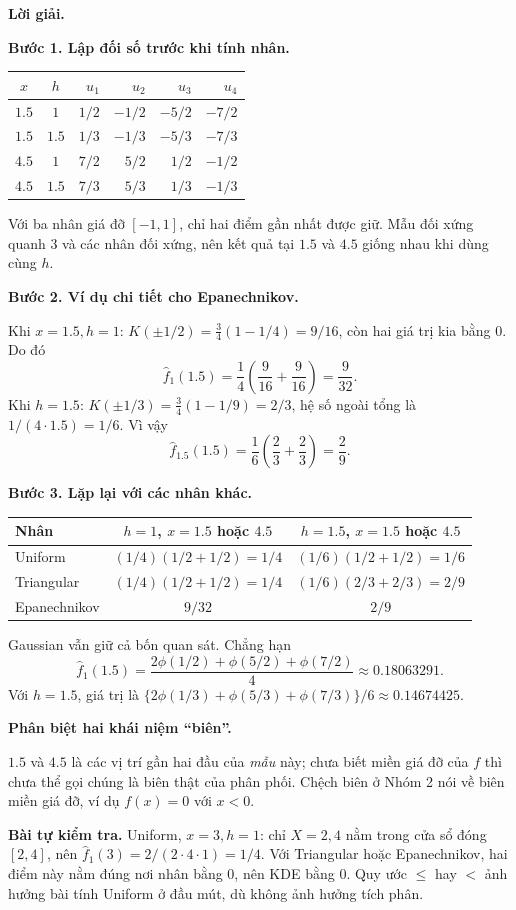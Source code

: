 \documentclass[11pt,a4paper]{article}
\newcommand{\buoc}[1]{\par\medskip\textbf{#1}\par}
\begin{document}
\textbf{Lời giải.}
\buoc{Bước 1. Lập đối số trước khi tính nhân.}
\begin{center}
\begin{tabular}{ccrrrr}
\toprule
$x$&$h$&$u_1$&$u_2$&$u_3$&$u_4$\\
\midrule
$1.5$&$1$&$1/2$&$-1/2$&$-5/2$&$-7/2$\\
$1.5$&$1.5$&$1/3$&$-1/3$&$-5/3$&$-7/3$\\
$4.5$&$1$&$7/2$&$5/2$&$1/2$&$-1/2$\\
$4.5$&$1.5$&$7/3$&$5/3$&$1/3$&$-1/3$\\
\bottomrule
\end{tabular}
\end{center}
Với ba nhân giá đỡ $[-1,1]$, chỉ hai điểm gần nhất được giữ. Mẫu đối xứng quanh 3 và các nhân đối xứng, nên kết quả tại $1.5$ và $4.5$ giống nhau khi dùng cùng $h$.

\buoc{Bước 2. Ví dụ chi tiết cho Epanechnikov.}
Khi $x=1.5,h=1$: $K(\pm1/2)=\frac34(1-1/4)=9/16$, còn hai giá trị kia bằng 0. Do đó
\[
\widehat f_1(1.5)=\frac14\left(\frac9{16}+\frac9{16}\right)=\boxed{\frac9{32}}.
\]
Khi $h=1.5$: $K(\pm1/3)=\frac34(1-1/9)=2/3$, hệ số ngoài tổng là $1/(4\cdot1.5)=1/6$. Vì vậy
\[
\widehat f_{1.5}(1.5)=\frac16\left(\frac23+\frac23\right)=\boxed{\frac29}.
\]
\buoc{Bước 3. Lặp lại với các nhân khác.}
\begin{center}
\begin{tabular}{lcc}
\toprule
Nhân & $h=1$, $x=1.5$ hoặc $4.5$ & $h=1.5$, $x=1.5$ hoặc $4.5$\\
\midrule
Uniform & $(1/4)(1/2+1/2)=1/4$ & $(1/6)(1/2+1/2)=1/6$\\
Triangular & $(1/4)(1/2+1/2)=1/4$ & $(1/6)(2/3+2/3)=2/9$\\
Epanechnikov & $9/32$ & $2/9$\\
\bottomrule
\end{tabular}
\end{center}
Gaussian vẫn giữ cả bốn quan sát. Chẳng hạn
\[
\widehat f_1(1.5)=\frac{2\phi(1/2)+\phi(5/2)+\phi(7/2)}4
\approx0.18063291.
\]
Với $h=1.5$, giá trị là $\{2\phi(1/3)+\phi(5/3)+\phi(7/3)\}/6\approx0.14674425$.

\buoc{Phân biệt hai khái niệm ``biên''.}
$1.5$ và $4.5$ là các vị trí gần hai đầu của \emph{mẫu} này; chưa biết miền giá đỡ của $f$ thì chưa thể gọi chúng là biên thật của phân phối. Chệch biên ở Nhóm 2 nói về biên miền giá đỡ, ví dụ $f(x)=0$ với $x<0$.

\textbf{Bài tự kiểm tra.} Uniform, $x=3,h=1$: chỉ $X=2,4$ nằm trong cửa sổ đóng $[2,4]$, nên $\widehat f_1(3)=2/(2\cdot4\cdot1)=1/4$. Với Triangular hoặc Epanechnikov, hai điểm này nằm đúng nơi nhân bằng 0, nên KDE bằng 0. Quy ước $\leq$ hay $<$ ảnh hưởng bài tính Uniform ở đầu mút, dù không ảnh hưởng tích phân.
\end{document}
